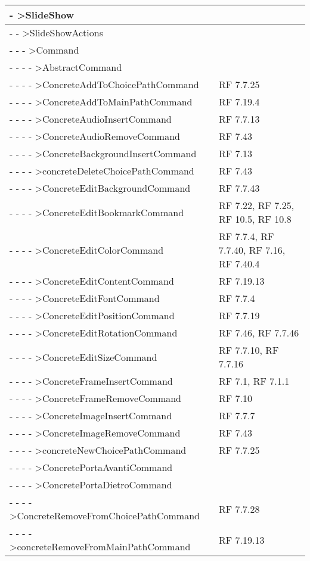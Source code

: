{\begin{longtable} [c]{| p{8cm} | p{5cm} |}
 \hline 
- >SlideShow & \\ 
 \hline 
- - >SlideShowActions & \\ 
 \hline 
- - - >Command & \\ 
 \hline 
- - - - >AbstractCommand & \\ 
 \hline 
- - - - >ConcreteAddToChoicePathCommand & RF 7.7.25\\ 
 \hline 
- - - - >ConcreteAddToMainPathCommand & RF 7.19.4\\ 
 \hline 
- - - - >ConcreteAudioInsertCommand & RF 7.7.13\\ 
 \hline 
- - - - >ConcreteAudioRemoveCommand & RF 7.43\\ 
 \hline 
- - - - >ConcreteBackgroundInsertCommand & RF 7.13\\ 
 \hline 
- - - - >concreteDeleteChoicePathCommand & RF 7.43\\ 
 \hline 
- - - - >ConcreteEditBackgroundCommand & RF 7.7.43\\ 
 \hline 
- - - - >ConcreteEditBookmarkCommand & RF 7.22, RF 7.25, RF 10.5, RF 10.8\\ 
 \hline 
- - - - >ConcreteEditColorCommand & RF 7.7.4, RF 7.7.40, RF 7.16, RF 7.40.4\\ 
 \hline 
- - - - >ConcreteEditContentCommand & RF 7.19.13\\ 
 \hline 
- - - - >ConcreteEditFontCommand & RF 7.7.4\\ 
 \hline 
- - - - >ConcreteEditPositionCommand & RF 7.7.19\\ 
 \hline 
- - - - >ConcreteEditRotationCommand & RF 7.46, RF 7.7.46\\ 
 \hline 
- - - - >ConcreteEditSizeCommand & RF 7.7.10, RF 7.7.16\\ 
 \hline 
- - - - >ConcreteFrameInsertCommand & RF 7.1, RF 7.1.1\\ 
 \hline 
- - - - >ConcreteFrameRemoveCommand & RF 7.10\\ 
 \hline 
- - - - >ConcreteImageInsertCommand & RF 7.7.7\\ 
 \hline 
- - - - >ConcreteImageRemoveCommand & RF 7.43\\ 
 \hline 
- - - - >concreteNewChoicePathCommand & RF 7.7.25\\ 
 \hline 
- - - - >ConcretePortaAvantiCommand & \\ 
 \hline 
- - - - >ConcretePortaDietroCommand & \\ 
 \hline 
- - - - >ConcreteRemoveFromChoicePathCommand & RF 7.7.28\\ 
 \hline 
- - - - >concreteRemoveFromMainPathCommand & RF 7.19.13\\ 

\end{longtable}}
